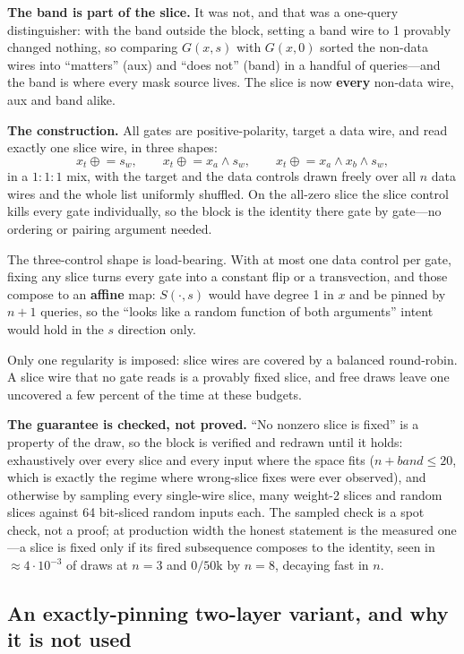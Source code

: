 \documentclass[11pt]{article}
\newcommand{\xor}{\oplus}
\begin{document}
\textbf{The band is part of the slice.} It was not, and that was a
one-query distinguisher: with the band outside the block, setting a band wire to
1 provably changed nothing, so comparing $G(x,s)$ with $G(x,0)$ sorted the
non-data wires into ``matters'' (aux) and ``does not'' (band) in a handful of
queries---and the band is where every mask source lives. The slice is now
\textbf{every} non-data wire, aux and band alike.

\textbf{The construction.} All gates are positive-polarity, target a data wire,
and read exactly one slice wire, in three shapes:
\[
x_t \mathrel{\xor}= s_w, \qquad
x_t \mathrel{\xor}= x_a \wedge s_w, \qquad
x_t \mathrel{\xor}= x_a \wedge x_b \wedge s_w,
\]
in a $1{:}1{:}1$ mix, with the target and the data controls drawn freely over
all $n$ data wires and the whole list uniformly shuffled. On the all-zero slice
the slice control kills every gate individually, so the block is the identity
there gate by gate---no ordering or pairing argument needed.

The three-control shape is load-bearing. With at most one data control per gate,
fixing any slice turns every gate into a constant flip or a transvection, and
those compose to an \textbf{affine} map: $S(\cdot,s)$ would have degree 1 in $x$
and be pinned by $n{+}1$ queries, so the ``looks like a random function of both
arguments'' intent would hold in the $s$ direction only.

Only one regularity is imposed: slice wires are covered by a balanced
round-robin. A slice wire that no gate reads is a provably fixed slice, and free
draws leave one uncovered a few percent of the time at these budgets.

\textbf{The guarantee is checked, not proved.} ``No nonzero slice is fixed'' is
a property of the draw, so the block is verified and redrawn until it holds:
exhaustively over every slice and every input where the space fits
($n+\mathit{band}\le 20$, which is exactly the regime where wrong-slice fixes
were ever observed), and otherwise by sampling every single-wire slice, many
weight-2 slices and random slices against 64 bit-sliced random inputs each. The
sampled check is a spot check, not a proof; at production width the honest
statement is the measured one---a slice is fixed only if its fired subsequence
composes to the identity, seen in ${\approx}4\cdot10^{-3}$ of draws at $n{=}3$
and $0/50\mathrm{k}$ by $n{=}8$, decaying fast in $n$.

\subsection{An exactly-pinning two-layer variant, and why it is not used}
\end{document}
